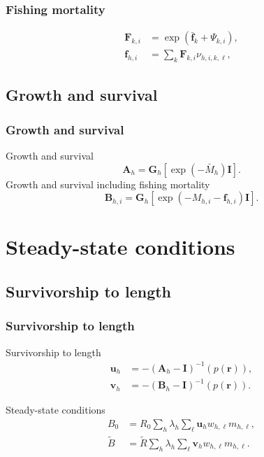 \documentclass{beamer}
\begin{document}

\begin{frame}
\frametitle{Fishing mortality}
\begin{align*}
  \boldsymbol{F}_{k,i} &= \exp \left( \bar{\boldsymbol{f}}_k + \Psi_{k,i}
  \right),\\
  \boldsymbol{f}_{h,i} &= \sum_k \boldsymbol{F}_{k,i} \nu_{h,i,k,\ell},
\end{align*}
\end{frame}


\subsection{Growth and survival}
\begin{frame}
\frametitle{Growth and survival}
Growth and survival
\begin{equation*}
  \boldsymbol{A}_{h} = \boldsymbol{G}_h \left[ \exp (-\bar{M}_h) \boldsymbol{I}
  \right].
\end{equation*}
Growth and survival including fishing mortality
\begin{equation*}
  \boldsymbol{B}_{h,i} = \boldsymbol{G}_h \left[ \exp (-M_{h,i} -
    \boldsymbol{f}_{h,i}) \boldsymbol{I} \right].
\end{equation*}
\end{frame}


\section{Steady-state conditions}
\subsection{Survivorship to length}

\begin{frame}
\frametitle{Survivorship to length}

Survivorship to length
\begin{align*}
  \boldsymbol{u}_h &= -(\boldsymbol{A}_h - \boldsymbol{I})^{-1} (p(\boldsymbol{r})),\\
  \boldsymbol{v}_h &= -(\boldsymbol{B}_h - \boldsymbol{I})^{-1} (p(\boldsymbol{r})).
\end{align*}

Steady-state conditions
\begin{align*}
  B_0 &= R_0 \sum_h \lambda_h \sum_\ell \boldsymbol{u}_h w_{h,\ell} m_{h,\ell},\\
  \tilde{B} &= \tilde{R} \sum_h \lambda_h \sum_\ell \boldsymbol{v}_h w_{h,\ell}
  m_{h,\ell}.
\end{align*}
\end{frame}
\end{document}
